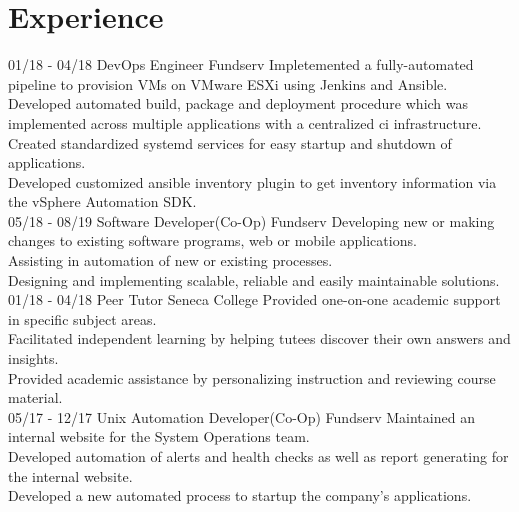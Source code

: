 \documentclass[]{friggeri-cv}
\begin{document}
\section{Experience}
\begin{entrylist}
  \entry
    {01/18 - 04/18}
    {DevOps Engineer}
    {Fundserv}
    {Impletemented a fully-automated pipeline to provision VMs on VMware ESXi using Jenkins and Ansible.\\
    Developed automated build, package and deployment procedure which was implemented across multiple applications with a centralized ci infrastructure.\\
    Created standardized systemd services for easy startup and shutdown of applications.\\
    Developed customized ansible inventory plugin to get inventory information via the vSphere Automation SDK.\\}
  \entry
    {05/18 - 08/19}
    {Software Developer(Co-Op)}
    {Fundserv}
    {Developing new or making changes to existing software programs, web or mobile applications.\\
    Assisting in automation of new or existing processes.\\
    Designing and implementing scalable, reliable and easily maintainable solutions.\\}
  \entry
    {01/18 - 04/18}
    {Peer Tutor}
    {Seneca College}
    {Provided one-on-one academic support in specific subject areas.\\
    Facilitated independent learning by helping tutees discover their own answers and insights.\\
    Provided academic assistance by personalizing instruction and reviewing course material.\\}
  \entry
    {05/17 - 12/17}
    {Unix Automation Developer(Co-Op)}
    {Fundserv}
    {Maintained an internal website for the System Operations team.\\
    Developed automation of alerts and health checks as well as report generating for the internal website.\\
    Developed a new automated process to startup the company's applications.\\}
\end{entrylist}
\end{document}
